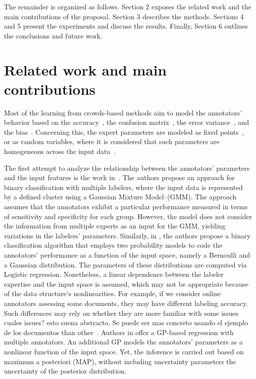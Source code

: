 \documentclass[journal]{IEEEtran}
\newcommand{\comment}[2]{{\color{blue}#1} {\color{red}#2}}
\begin{document}
The remainder is organized as follows. Section 2 exposes the related
work and the main contributions of the proposal. Section 3 describes the
methods. Sections 4 and 5 present the experiments and discuss the
results. Finally, Section 6 outlines the conclusions and future work.

\section{Related work and main contributions}

Most of the learning from crowds-based methods aim to model the
annotators' behavior based on the
accuracy~\cite{rodrigues2013learning}, the confusion
matrix~\cite{gonzalez2015automatic}, the error
variance~\cite{raykar2010learning}, and the
bias~\cite{rodrigues2017learning}. Concerning this, the expert
parameters are modeled as fixed points~\cite{rodrigues2014gaussian},
or as random variables, where it is considered that such parameters
are homogeneous across the input data~\cite{morales2019scalable}.

The first attempt to analyze the relationship between the annotators'
parameters and the input features is the work
in~\cite{zhang2011learning}. The authors propose an approach for
binary classification with multiple labelers, where the input data is
represented by a defined cluster using a Gaussian Mixture
Model--(GMM). The approach assumes that the annotators exhibit a
particular performance measured in terms of sensitivity and
specificity for each group. However, the model does not consider the
information from multiple experts as an input for the GMM, yielding
variations in the labelers' parameters. Similarly, in
\cite{yan2014learning}, the authors propose a binary classification
algorithm that employs two probability models to code the annotators'
performance as a function of the input space, namely a Bernoulli and a
Gaussian distribution. The parameters of these distributions are
computed via Logistic regression. Nonetheless, a linear dependence
between the labeler expertise and the input space is assumed, which
may not be appropriate because of the data structure's
nonlinearities. For example, if we consider online annotators
assessing some documents, they may have different labeling
accuracy. Such differences may rely on whether they are more familiar
with \comment{some issues}{cuales issues? esto suena abstracto. Se
  puede ser mas concreto usando el ejemplo de los documentos} than
other~\cite{wang2016bi}. Authors in \cite{xiao2013learning} offer a
GP-based regression with multiple annotators. An additional GP models
the annotators' parameters as a nonlinear function of the input
space. Yet, the inference is carried out based on maximum a posteriori
(MAP), without including \comment{uncertainty parameters}{the
  uncertainty of the posterior distribution}.
\end{document}

